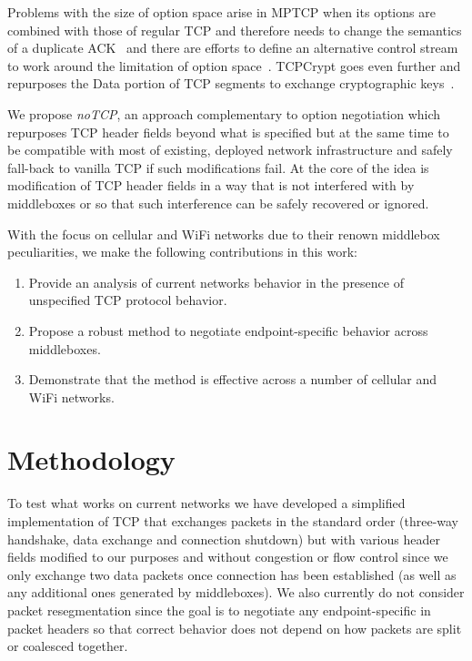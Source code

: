 \documentclass{sig-alternate-10pt}
\begin{document}
Problems with the size of option space arise in MPTCP when its options are combined with those of regular TCP and therefore needs to change the semantics of a duplicate ACK~\cite{Handley:vj} and there are efforts to define an alternative control stream to work around the limitation of option space~\cite{Bonaventure:wx}. TCPCrypt goes even further and repurposes the Data portion of TCP segments to exchange cryptographic keys~\cite{Mazieres:uz}.

We propose \emph{noTCP}, an approach complementary to option negotiation which repurposes TCP header fields beyond what is specified but at the same time to be compatible with most of existing, deployed network infrastructure and safely fall-back to vanilla TCP if such modifications fail. At the core of the idea is modification of TCP header fields in a way that is not interfered with by middleboxes or so that such interference can be safely recovered or ignored.

With the focus on cellular and WiFi networks due to their renown middlebox peculiarities, we make the following contributions in this work:

\begin{enumerate}
    \item Provide an analysis of current networks behavior in the presence of unspecified TCP protocol behavior.
    \item Propose a robust method to negotiate endpoint-specific behavior across middleboxes.
    \item Demonstrate that the method is effective across a number of cellular and WiFi networks.
\end{enumerate}

\section{Methodology}

To test what works on current networks we have developed a simplified implementation of TCP that exchanges packets in the standard order (three-way handshake, data exchange and connection shutdown) but with various header fields modified to our purposes and without congestion or flow control since we only exchange two data packets once connection has been established (as well as any additional ones generated by middleboxes). We also currently do not consider packet resegmentation since the goal is to negotiate any endpoint-specific in packet headers so that correct behavior does not depend on how packets are split or coalesced together.
\end{document}
